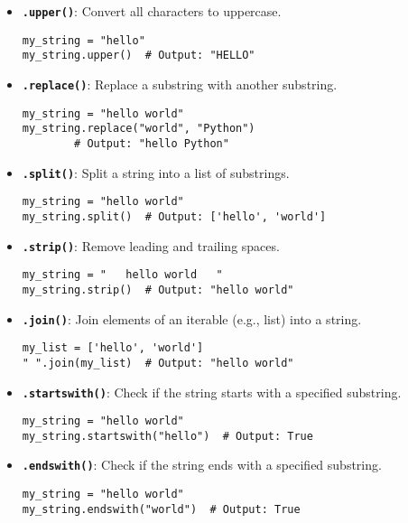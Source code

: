 \begin{itemize}
\begin{itemize}
    \item \textbf{\texttt{.upper()}}: Convert all characters to uppercase.
    \begin{verbatim}
my_string = "hello"
my_string.upper()  # Output: "HELLO"
    \end{verbatim}

    \item \textbf{\texttt{.replace()}}: Replace a substring with another substring.
    \begin{verbatim}
my_string = "hello world"
my_string.replace("world", "Python")  
        # Output: "hello Python"
    \end{verbatim}

    \item \textbf{\texttt{.split()}}: Split a string into a list of substrings.
    \begin{verbatim}
my_string = "hello world"
my_string.split()  # Output: ['hello', 'world']
    \end{verbatim}

    \item \textbf{\texttt{.strip()}}: Remove leading and trailing spaces.
    \begin{verbatim}
my_string = "   hello world   "
my_string.strip()  # Output: "hello world"
    \end{verbatim}

    \item \textbf{\texttt{.join()}}: Join elements of an iterable (e.g., list) into a string.
    \begin{verbatim}
my_list = ['hello', 'world']
" ".join(my_list)  # Output: "hello world"
    \end{verbatim}

    \item \textbf{\texttt{.startswith()}}: Check if the string starts with a specified substring.
    \begin{verbatim}
my_string = "hello world"
my_string.startswith("hello")  # Output: True
    \end{verbatim}

    \item \textbf{\texttt{.endswith()}}: Check if the string ends with a specified substring.
    \begin{verbatim}
my_string = "hello world"
my_string.endswith("world")  # Output: True
    \end{verbatim}
\end{itemize}

\end{itemize}
